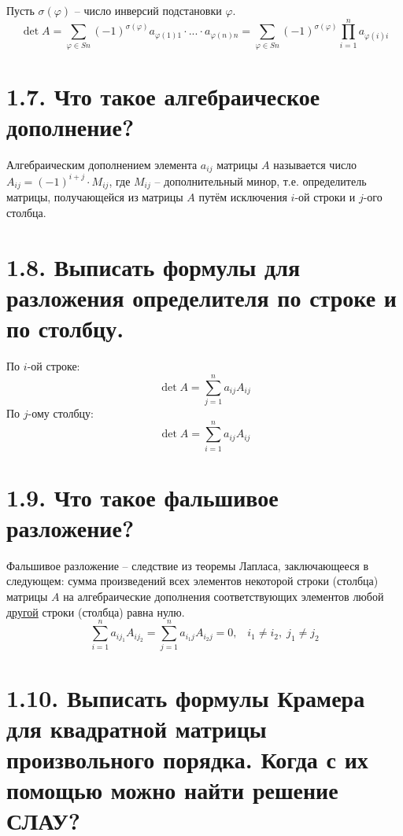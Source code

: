 \documentclass{article}
\begin{document}
Пусть $\sigma(\varphi)$ -- число инверсий подстановки $\varphi$.
$$
\det{A} = \sum_{\varphi \in Sn}(-1)^{\sigma(\varphi)}a_{\varphi(1)1}\cdot...\cdot a_{\varphi(n)n} = \sum_{\varphi \in Sn}(-1)^{\sigma(\varphi)} \prod_{i = 1}^n a_{\varphi(i)i}
$$

\section*{\LARGE 1.7. Что такое алгебраическое дополнение?  }

Алгебраическим дополнением элемента $a_{ij}$ матрицы $A$ называется число 
\newline $A_{ij} = (-1)^{i + j}\cdot M_{ij}$, где $M_{ij}$ -- дополнительный минор, т.е. определитель матрицы, получающейся из матрицы $A$ путём исключения $i$-ой строки и $j$-ого столбца.

\section*{\LARGE 1.8. Выписать формулы для разложения определителя по строке и по столбцу. }

По $i$-ой строке:
$$
\det{A} = \sum_{j = 1}^n a_{ij}A_{ij}
$$
По $j$-ому столбцу:
$$
\det{A} = \sum_{i = 1}^n a_{ij}A_{ij}
$$

\section*{\LARGE 1.9. Что такое фальшивое разложение?  }

Фальшивое разложение -- следствие из теоремы Лапласа, заключающееся в следующем: сумма произведений всех элементов некоторой строки (столбца) матрицы $A$ на алгебраические дополнения соответствующих элементов любой \underline{другой} строки (столбца) равна нулю.
$$
\sum_{i = 1}^n a_{ij_1}A_{ij_2} = \sum_{j = 1}^n a_{i_1j}A_{i_2j} = 0, \;\;\;i_1 \ne i_2, \; j_1 \ne j_2
$$

\section*{\LARGE 1.10. Выписать формулы Крамера для квадратной матрицы произвольного порядка. Когда с их помощью можно найти решение СЛАУ?  }
\end{document}
